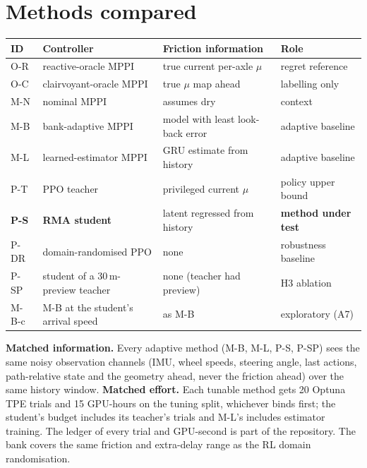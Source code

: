 \documentclass[11pt]{article}
\begin{document}
\section{Methods compared}\label{sec:methods}
\begin{center}\small
\begin{tabular}{@{}llll@{}}
\toprule
ID & Controller & Friction information & Role\\
\midrule
O-R & reactive-oracle MPPI & true current per-axle $\mu$ & regret reference\\
O-C & clairvoyant-oracle MPPI & true $\mu$ map ahead & labelling only\\
M-N & nominal MPPI & assumes dry & context\\
M-B & bank-adaptive MPPI & model with least look-back error & adaptive baseline\\
M-L & learned-estimator MPPI & GRU estimate from history & adaptive baseline\\
P-T & PPO teacher & privileged current $\mu$ & policy upper bound\\
\textbf{P-S} & \textbf{RMA student} & latent regressed from history & \textbf{method under test}\\
P-DR & domain-randomised PPO & none & robustness baseline\\
P-SP & student of a 30\,m-preview teacher & none (teacher had preview) & H3 ablation\\
M-B-c & M-B at the student's arrival speed & as M-B & exploratory (A7)\\
\bottomrule
\end{tabular}
\end{center}
\textbf{Matched information.} Every adaptive method (M-B, M-L, P-S, P-SP) sees the same noisy observation channels
(IMU, wheel speeds, steering angle, last actions, path-relative state and the geometry ahead, never the friction
ahead) over the same history window. \textbf{Matched effort.} Each tunable method gets 20 Optuna TPE trials and
15 GPU-hours on the tuning split, whichever binds first; the student's budget includes its teacher's trials and
M-L's includes estimator training. The ledger of every trial and GPU-second is part of the repository.
The bank covers the same friction and extra-delay range as the RL domain randomisation.
\end{document}

